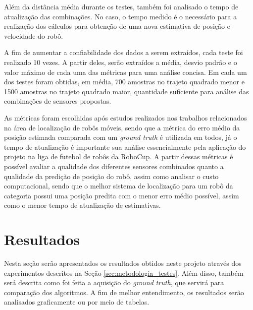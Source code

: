\documentclass[acronym, symbols, table]{fei}
\begin{document}
		Além da distância média durante os testes, também foi analisado o tempo de atualização das combinações. No caso, o tempo medido é o necessário para a realização dos cálculos para obtenção de uma nova estimativa de posição e velocidade do robô.
		
		
		A fim de aumentar a confiabilidade dos dados a serem extraídos, cada teste foi realizado 10 vezes. A partir deles, serão extraídos a média, desvio padrão e o valor máximo de cada uma das métricas para uma análise concisa. Em cada um dos testes foram obtidas, em média, 700 amostras no trajeto quadrado menor e 1500 amostras no trajeto quadrado maior, quantidade suficiente para análise das combinações de sensores propostas.
		
		As métricas foram escolhidas após estudos realizados nos trabalhos relacionados na área de localização de robôs móveis, sendo que a métrica do erro médio da posição estimada comparada com um \textit{ground truth} é utilizada em todos, já o tempo de atualização é importante sua análise essencialmente pela aplicação do projeto na liga de futebol de robôs  da RoboCup. A partir dessas métricas é possível avaliar a qualidade dos diferentes sensores combinados quanto a qualidade da predição de posição do robô, assim como analisar o custo computacional, sendo que o melhor sistema de localização para um robô da categoria  possui uma posição predita com o menor erro médio possível, assim como o menor tempo de atualização de estimativas.
		
	\chapter{Resultados} \label{sec:resultados}
	
		Nesta seção serão apresentados os resultados obtidos neste projeto através dos experimentos descritos na Seção \ref{sec:metodologia_testes}. Além disso, também será descrita como foi feita a aquisição do \textit{ground truth}, que servirá para comparação dos algoritmos. A fim de melhor entendimento, os resultados serão analisados graficamente ou por meio de tabelas.
		
\end{document}
